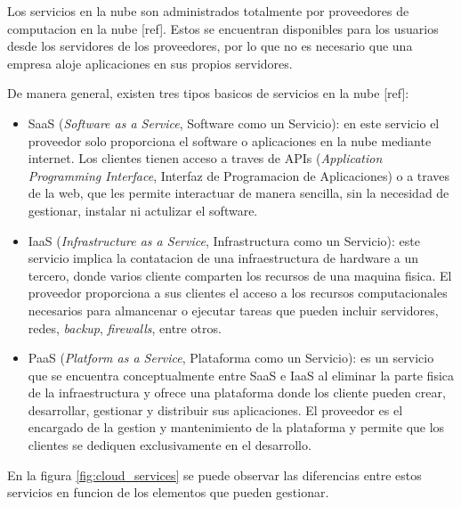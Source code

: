 Los servicios en la nube son administrados totalmente por proveedores de computacion en la nube [ref]. Estos se encuentran disponibles para los usuarios desde los servidores de los proveedores, por lo que no es necesario que una empresa aloje aplicaciones en sus propios servidores.

De manera general, existen tres tipos basicos de servicios en la nube [ref]:

\begin{itemize}
	\item SaaS (\textit{Software as a Service}, Software como un Servicio): en este servicio el proveedor solo proporciona el software o aplicaciones en la nube mediante internet. Los clientes tienen acceso a traves de APIs (\textit{Application Programming Interface}, Interfaz de Programacion de Aplicaciones) o a traves de la web, que les permite interactuar de manera sencilla, sin la necesidad de gestionar, instalar ni actulizar el software. 
	\item IaaS (\textit{Infrastructure as a Service}, Infrastructura como un Servicio): este servicio implica la contatacion de una infraestructura de hardware a un tercero, donde varios cliente comparten los recursos de una maquina fisica. El proveedor proporciona a sus clientes el acceso a los recursos computacionales necesarios para almancenar o ejecutar tareas que pueden incluir servidores, redes, \textit{backup}, \textit{firewalls}, entre otros.
	\item PaaS (\textit{Platform as a Service}, Plataforma como un Servicio): es un servicio que se encuentra conceptualmente entre SaaS e IaaS al eliminar la parte fisica de la infraestructura y ofrece una plataforma donde los cliente pueden crear, desarrollar, gestionar y distribuir sus aplicaciones. El proveedor es el encargado de la gestion y mantenimiento de la plataforma y permite que los clientes se dediquen exclusivamente en el desarrollo.
\end{itemize}

En la figura \ref{fig:cloud_services} se puede observar las diferencias entre estos servicios en funcion de los elementos que pueden gestionar.

